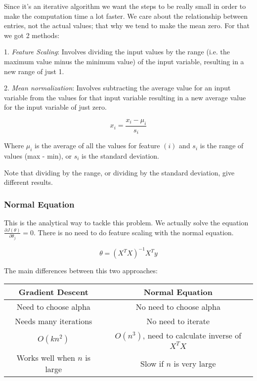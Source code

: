 Since it's an iterative algorithm we want the steps to be really small in order to make the computation time a lot faster. We care about the relationship between entries, not the actual values; that why we tend to make the mean zero. For that we got 2 methods:

1. \textit{Feature Scaling}: Involves dividing the input values by the range (i.e. the maximum value minus the minimum value) of the input variable, resulting in a new range of just 1.

2. \textit{Mean normalization}: Involves subtracting the average value for an input variable from the values for that input variable resulting in a new average value for the input variable of just zero.

$$x_i = \frac{x_i - \mu_i}{s_i}$$

Where $\mu_i$ is the average of all the values for feature $(i)$ and $s_i$ is the range of values (max - min), or $s_i$ is the standard deviation.

Note that dividing by the range, or dividing by the standard deviation, give different results. 

\subsubsection{Normal Equation}
This is the analytical way to tackle this problem. We actually solve the equation $\frac{\partial{J(\theta)}}{\partial{\theta_{j}}} = 0$. There is no need to do feature scaling with the normal equation.

$$\theta = (X^TX)^{-1}X^Ty$$


The main differences between this two approaches:



\begin{center}
\begin{tabular}{ |c|c| } 
\hline
Gradient Descent & Normal Equation \\
\hline
Need to choose alpha & No need to choose alpha \\
\hline
Needs many iterations & No need to iterate \\
\hline
$O(kn^2)$ & $O(n^3)$, need to calculate inverse of $X^TX$ \\
\hline
Works well when $n$ is large & Slow if $n$ is very large \\
\hline
\end{tabular}
\end{center}

